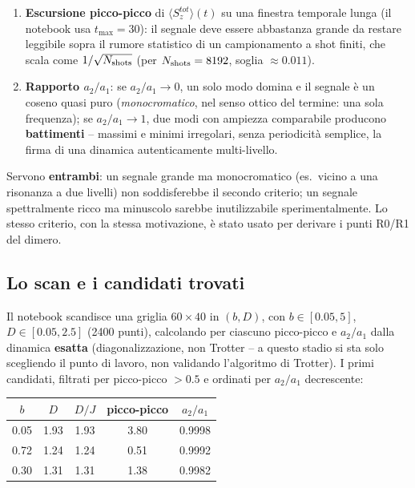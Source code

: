 \documentclass[11pt,a4paper]{article}
\begin{document}
\begin{enumerate}
\item \textbf{Escursione picco-picco} di $\langle S_z^{tot}\rangle(t)$ su
una finestra temporale lunga (il notebook usa $t_{\max}=30$): il segnale
deve essere abbastanza grande da restare leggibile sopra il rumore
statistico di un campionamento a shot finiti, che scala come
$1/\sqrt{N_{\rm shots}}$ (per $N_{\rm shots}=8192$, soglia
$\approx0.011$).
\item \textbf{Rapporto $a_2/a_1$}: se $a_2/a_1\to0$, un solo modo domina
e il segnale è un coseno quasi puro (\emph{monocromatico}, nel senso
ottico del termine: una sola frequenza); se $a_2/a_1\to1$, due modi con
ampiezza comparabile producono \textbf{battimenti} -- massimi e minimi
irregolari, senza periodicità semplice, la firma di una dinamica
autenticamente multi-livello.
\end{enumerate}
Servono \textbf{entrambi}: un segnale grande ma monocromatico (es.\ vicino
a una risonanza a due livelli) non soddisferebbe il secondo criterio; un
segnale spettralmente ricco ma minuscolo sarebbe inutilizzabile
sperimentalmente. Lo stesso criterio, con la stessa motivazione, è stato
usato per derivare i punti R0/R1 del dimero.

\subsection{Lo scan e i candidati trovati}

Il notebook scandisce una griglia $60\times40$ in $(b,D)$, con
$b\in[0.05,5]$, $D\in[0.05,2.5]$ (2400 punti), calcolando per ciascuno
picco-picco e $a_2/a_1$ dalla dinamica \textbf{esatta} (diagonalizzazione,
non Trotter -- a questo stadio si sta solo scegliendo il punto di lavoro,
non validando l'algoritmo di Trotter). I primi candidati, filtrati per
picco-picco $>0.5$ e ordinati per $a_2/a_1$ decrescente:

\begin{center}
\begin{tabular}{@{}ccccc@{}}
\toprule
$b$ & $D$ & $D/J$ & picco-picco & $a_2/a_1$ \\
\midrule
0.05 & 1.93 & 1.93 & 3.80 & 0.9998 \\
0.72 & 1.24 & 1.24 & 0.51 & 0.9992 \\
0.30 & 1.31 & 1.31 & 1.38 & 0.9982 \\
\bottomrule
\end{tabular}
\end{center}
\end{document}
